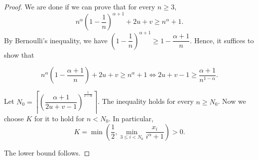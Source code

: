 \begin{proof}
  We are done if we can prove that for every $n\ge 3$,
  $$n^{\alpha}\left(1-\dfrac{1}{n}\right)^{\alpha+1} + 2u+v \ge n^\alpha + 1.$$
  By Bernoulli's inequality, we have $\left(1-\dfrac{1}{n}\right)^{\alpha+1} \ge 1 - \dfrac{\alpha+1}{n}$. Hence, it suffices to show that

  $$n^{\alpha}\left(1-\dfrac{\alpha+1}{n}\right) + 2u+v \ge n^\alpha + 1 \iff 2u + v - 1 \ge \dfrac{\alpha+1}{n^{1-\alpha}}.$$

  Let $N_0 = \left\lceil \left(\dfrac{\alpha+1}{2u + v - 1}\right)^{\frac{1}{1-\alpha}} \right\rceil$. The inequality holds for every $n\ge N_0$. Now we choose $K$ for it to hold for $n < N_0$. In particular,
  $$K = \min\left(\dfrac{1}{2}, \min\limits_{3\le i < N_0}\dfrac{x_i}{i^{\alpha} + 1}\right) > 0.$$

  The lower bound follows.




\end{proof}

